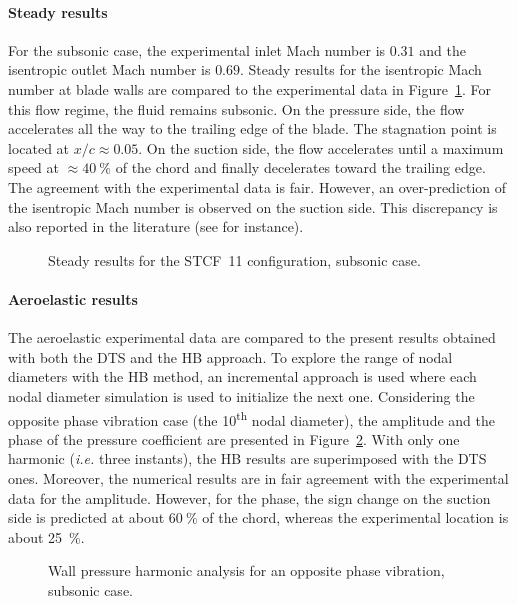 
\paragraph{Steady results}

For the subsonic case, 
the experimental inlet Mach number is $0.31$ 
and the isentropic outlet Mach number is $0.69$.
Steady results for the isentropic Mach number at 
blade walls are compared to the experimental data in 
Figure~\ref{fig:stcf11_rans_subsonic}.  For this flow regime, the fluid
remains subsonic.
On the pressure side, the flow accelerates all the way
to the trailing edge of the blade. 
The stagnation point is located at $x / c \approx 0.05$.
On the suction side, 
the flow
accelerates until a maximum speed at $\approx 40~\%$ of the chord and
finally decelerates toward the trailing edge.
The agreement with the experimental data is fair. However, an
over-prediction of the isentropic Mach number is observed on the suction
side.  This discrepancy is also reported in the literature (see
\citet{Fransson1999} for instance).

\begin{figure}[htp]
  \centering
  \caption{Steady results for the STCF~11 configuration, subsonic case.}
  \label{fig:stcf11_rans_subsonic}
\end{figure}

\paragraph{Aeroelastic results}

The aeroelastic experimental data are compared to the present results
obtained with both the DTS and the HB approach. To explore the range
of nodal diameters with the HB method, an incremental approach is used
where each nodal diameter simulation is used to initialize the next
one.  Considering the opposite phase vibration case (the 10\textsuperscript{th} nodal diameter), 
the amplitude and the phase of the pressure coefficient are
presented in Figure~\ref{fig:stcf11_ael_subsonic_ibpa_180_paper}.
With only one harmonic (\emph{i.e.} three instants), the HB results
are superimposed with the DTS ones. Moreover, the numerical results are
in fair agreement with the experimental data for the
amplitude. However, for the phase, the sign change on the
suction side is predicted at about $60~\%$ of the chord, whereas the
experimental location is about 25~\%.
\begin{figure}[htp]
  \centering
  \caption{Wall pressure harmonic analysis for an opposite phase vibration, subsonic case.}
  \label{fig:stcf11_ael_subsonic_ibpa_180_paper}
\end{figure}


